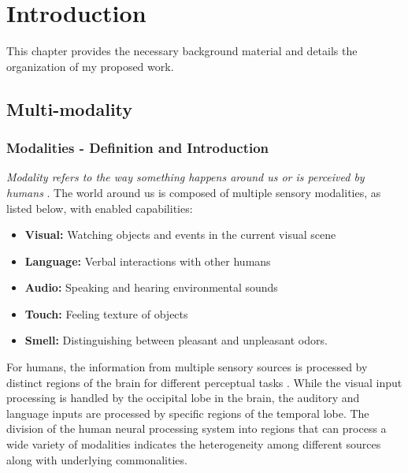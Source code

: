 \chapter{Introduction}
\label{cha:introduction}
This chapter provides the necessary background material and details the organization of my proposed work.

\section{Multi-modality}
\subsection{Modalities - Definition and Introduction}
\textit{Modality refers to the way something happens around us or is perceived by humans} \cite{Baltruaitis2017MultimodalML}. The world around us is composed of multiple sensory modalities, as listed below, with enabled capabilities:
\begin{itemize}
    \item \textbf{Visual:} Watching objects and events in the current visual scene
    \item \textbf{Language:} Verbal interactions with other humans 
    \item \textbf{Audio:} Speaking and hearing environmental sounds 
    \item \textbf{Touch:} Feeling texture of objects 
    \item \textbf{Smell:} Distinguishing between pleasant and unpleasant odors.
\end{itemize}
For humans, the information from multiple sensory sources is processed by distinct regions of the brain for different perceptual tasks \cite{Alain2001WhatA,BornkesselSchlesewsky2015NeurobiologicalRO,Wallace2002HistochemicalIO}. While the visual input processing is handled by the occipital lobe in the brain, the auditory and language inputs are processed by specific regions of the temporal lobe. The division of the human neural processing system into regions that can process a wide variety of modalities indicates the heterogeneity among different sources along with underlying commonalities.

